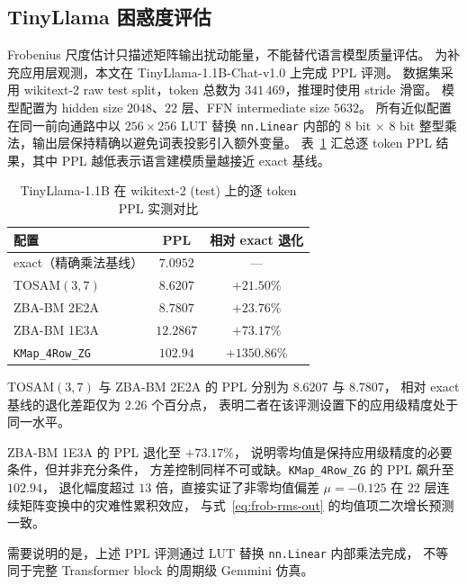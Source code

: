 \documentclass[12pt,a4paper,UTF8]{article}
\begin{document}
\subsection{TinyLlama 困惑度评估}
\label{subsubsec:llm_tinyllama}
\label{subsec:zbabm-tosam-llm}

Frobenius 尺度估计只描述矩阵输出扰动能量，不能替代语言模型质量评估。
为补充应用层观测，本文在 TinyLlama-1.1B-Chat-v1.0 上完成 PPL 评测。
数据集采用 wikitext-2 raw test split，token 总数为 $341\,469$，推理时使用 stride 滑窗。
模型配置为 hidden size $2048$、$22$ 层、FFN intermediate size $5632$。
所有近似配置在同一前向通路中以 $256\times256$ LUT 替换 \texttt{nn.Linear}
内部的 $8$ bit $\times$ $8$ bit 整型乘法，输出层保持精确以避免词表投影引入额外变量。
表~\ref{tab:zbabm-tosam-ppl} 汇总逐 token PPL 结果，其中 PPL 越低表示语言建模质量越接近 exact 基线。

\begin{table}[htbp]
    \centering
    \caption{TinyLlama-1.1B 在 wikitext-2 (test) 上的逐 token PPL 实测对比}
    \label{tab:zbabm-tosam-ppl}
    \small
    \setlength{\tabcolsep}{5pt}
    \begin{tabular}{lcc}
        \toprule
        配置 & PPL & 相对 exact 退化 \\
        \midrule
        exact（精确乘法基线）        & $7.0952$ & --- \\
        TOSAM$(3,7)$               & $8.6207$ & $+21.50\%$ \\
        ZBA-BM 2E2A                & $8.7807$ & $+23.76\%$ \\
        ZBA-BM 1E3A                & $12.2867$ & $+73.17\%$ \\
        \texttt{KMap\_4Row\_ZG}    & $102.94$ & $+1350.86\%$ \\
        \bottomrule
    \end{tabular}
\end{table}

TOSAM$(3,7)$ 与 ZBA-BM 2E2A 的 PPL 分别为 $8.6207$ 与 $8.7807$，
相对 exact 基线的退化差距仅为 $2.26$ 个百分点，
表明二者在该评测设置下的应用级精度处于同一水平。

ZBA-BM 1E3A 的 PPL 退化至 $+73.17\%$，
说明零均值是保持应用级精度的必要条件，但并非充分条件，
方差控制同样不可或缺。\texttt{KMap\_4Row\_ZG} 的 PPL 飙升至 $102.94$，
退化幅度超过 $13$ 倍，直接实证了非零均值偏差 $\mu{=}{-}0.125$
在 $22$ 层连续矩阵变换中的灾难性累积效应，
与式~\eqref{eq:frob-rms-out} 的均值项二次增长预测一致。

需要说明的是，上述 PPL 评测通过 LUT 替换 \texttt{nn.Linear} 内部乘法完成，
不等同于完整 Transformer block 的周期级 Gemmini 仿真。
\end{document}
